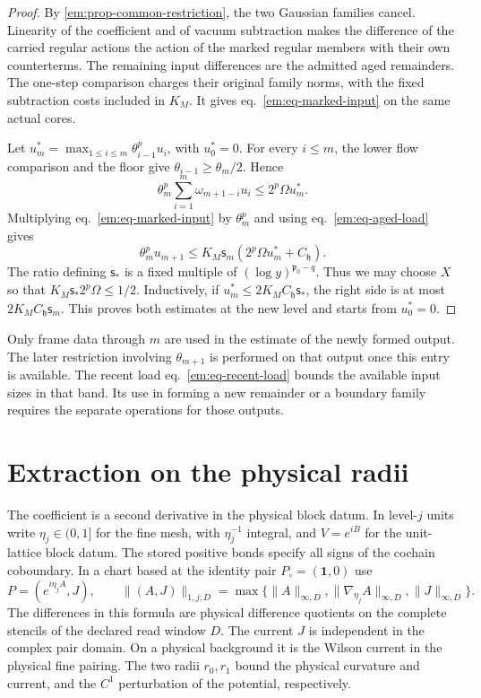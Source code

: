 \documentclass[11pt,letterpaper,reqno]{amsart}
\numberwithin{equation}{section}
\renewcommand{\eqref}[1]{\textup{eq.~\ref{#1}}}
\theoremstyle{definition}
\theoremstyle{remark}
\begin{document}
\begin{proof}
By \cref{em:prop-common-restriction}, the two Gaussian families
cancel. Linearity of the coefficient and of vacuum subtraction
makes the difference of the carried regular actions the action
of the marked regular members with their own counterterms. The
remaining input differences are the admitted aged remainders.
The one-step comparison charges their original family norms,
with the fixed subtraction costs included in $K_M$. It gives
\eqref{em:eq-marked-input} on the same actual cores.

Let $u_m^*=\max_{1\le i\le m}\theta_{i-1}^pu_i$, with $u_0^*=0$.
For every $i\le m$, the lower flow comparison and the floor give
$\theta_{i-1}\ge\theta_m/2$. Hence
\[
   \theta_m^p\sum_{i=1}^m\omega_{m+1-i}u_i
                        \le 2^p\Omega u_m^*.
\]
Multiplying \eqref{em:eq-marked-input} by $\theta_m^p$ and using
\eqref{em:eq-aged-load} gives
\[
  \theta_m^p u_{m+1}
       \le K_M\mathsf s_m(2^p\Omega u_m^*+C_{\mathfrak h}).
\]
The ratio defining $\mathsf s_*$ is a fixed multiple of
$(\log y)^{\mathfrak p_0-q}$. Thus we may choose $X$ so that
$K_M\mathsf s_*2^p\Omega\le1/2$. Inductively, if
$u_m^*\le 2K_MC_{\mathfrak h}\mathsf s_*$, the right side is at
most $2K_MC_{\mathfrak h}\mathsf s_m$. This proves both
estimates at the new level and starts from $u_0^*=0$.
\end{proof}

Only frame data through $m$ are used in the estimate of the newly
formed output. The later restriction involving $\theta_{m+1}$ is
performed on that output once this entry is available. The recent
load \eqref{em:eq-recent-load} bounds the available input sizes in
that band. Its use in forming a new remainder or a boundary family
requires the separate operations for those outputs.

\section{Extraction on the physical radii}
\label{em:sec-coefficient}

The coefficient is a second derivative in the physical block datum.
In level-$j$ units write $\eta_j\in(0,1]$ for the fine mesh, with
$\eta_j^{-1}$ integral, and
$V=e^{iB}$ for the unit-lattice block datum. The stored positive
bonds specify all signs of the cochain coboundary. In a chart based
at the identity pair $P_\circ=(\mathbf 1,0)$ use
\begin{equation}\label{em:eq-physical-pair-norm}
 P=(e^{i\eta_j A},J),\qquad
 \|(A,J)\|_{1,j;D}
   =\max\{\|A\|_{\infty,D},\|\nabla_{\eta_j}A\|_{\infty,D},
                             \|J\|_{\infty,D}\} .
\end{equation}
The differences in this formula are physical difference quotients
on the complete stencils of the declared read window $D$. The current
$J$ is independent in the complex pair domain. On a physical
background it is the Wilson current in the physical fine pairing.
The two radii $r_0,r_1$ bound the physical curvature and current, and
the $C^1$ perturbation of the potential, respectively.
\end{document}

